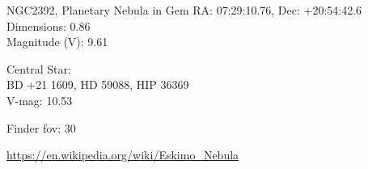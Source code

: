 \begin{block}{NGC2392, Planetary Nebula in Gem}
    RA: 07:29:10.76, Dec: +20:54:42.6 \\ 
    Dimensions: 0.86 \\ 
    Magnitude (V): 9.61

    Central Star: \\ 
      \hspace{1em}BD +21 1609, HD 59088, HIP 36369 \\ 
      \hspace{1em}V-mag: 10.53 


    Finder fov: 30 

    \url{https://en.wikipedia.org/wiki/Eskimo_Nebula} 
\end{block}